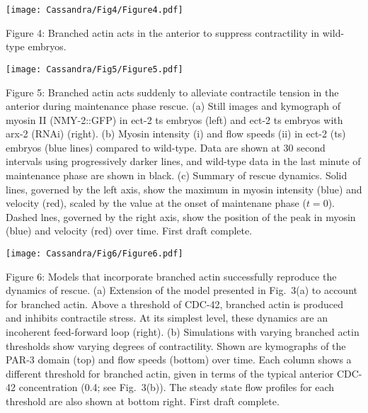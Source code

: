 \documentclass[11pt]{article}
\newcommand{\red}[1]{\color{red}#1\normalcolor}
\newcommand{\6}[1]{#1_{\text{6}}}
\newcommand{\3}[1]{#1_{\text{3}}}
\begin{document}
\newpage 
\begin{center}
\texttt{[image: Cassandra/Fig4/Figure4.pdf]}
\end{center}

\newpage 
Figure 4: Branched actin acts in the anterior to suppress contractility in wild-type embryos. 

\newpage 
\begin{center}
\texttt{[image: Cassandra/Fig5/Figure5.pdf]}
\end{center}

\newpage 
Figure 5: Branched actin acts suddenly to alleviate contractile tension in the anterior during maintenance phase rescue. (a) Still images and kymograph of myosin II (NMY-2::GFP) in ect-2 ts embryos (left) and ect-2 ts embryos with arx-2 (RNAi) (right). (b) Myosin intensity (i) and flow speeds (ii) in ect-2 (ts) embryos (blue lines) compared to wild-type. Data are shown at 30 second intervals using progressively darker lines, and wild-type data in the last minute of maintenance phase are shown in black. (c) Summary of rescue dynamics. Solid lines, governed by the left axis, show the maximum in myosin intensity (blue) and velocity (red), scaled by the value at the onset of maintenane phase ($t=0$). Dashed lnes, governed by the right axis, show the position of the peak in myosin (blue) and velocity (red) over time.  \red{First draft complete.}

\newpage 
\begin{center}
\texttt{[image: Cassandra/Fig6/Figure6.pdf]}
\end{center}

\newpage
Figure 6: Models that incorporate branched actin successfully reproduce the dynamics of rescue. (a) Extension of the model presented in Fig.\ 3(a) to account for branched actin. Above a threshold of CDC-42, branched actin is produced and inhibits contractile stress. At its simplest level, these dynamics are an incoherent feed-forward loop (right). (b) Simulations with varying branched actin thresholds show varying degrees of contractility. Shown are kymographs of the PAR-3 domain (top) and flow speeds (bottom) over time. Each column shows a different threshold for branched actin, given in terms of the typical anterior CDC-42 concentration (0.4; see Fig.\ 3(b)). The steady state flow profiles for each threshold are also shown at bottom right. \red{First draft complete.}




\end{document}
